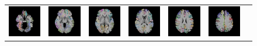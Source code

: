 \documentclass{frontiersSCNS} %
\begin{document}
\begin{figure}
\begin{center}
\renewcommand{\tabcolsep}{0pt}
\renewcommand\arraystretch{0}
\begin{tabular}{ccccccc}
\includegraphics[width=0.14\linewidth]{figures/aal_125_masked.png} & 
\includegraphics[width=0.14\linewidth]{figures/aal_135_masked.png} & 
\includegraphics[width=0.14\linewidth]{figures/aal_145_masked.png} & 
\includegraphics[width=0.14\linewidth]{figures/aal_155_masked.png} & 
\includegraphics[width=0.14\linewidth]{figures/aal_165_masked.png} & 
\includegraphics[width=0.14\linewidth]{figures/aal_175_masked.png} & 

\end{tabular}
\end{center}
\end{figure}
\end{document}
